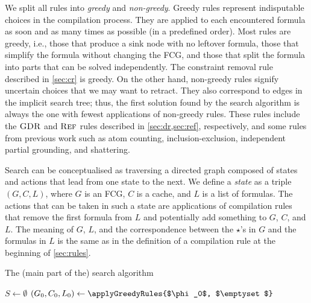 We split all rules into \emph{greedy} and \emph{non-greedy}. Greedy rules
represent indisputable choices in the compilation process. They are applied to
each encountered formula as soon and as many times as possible (in a predefined
order). Most rules are greedy, i.e., those that produce a sink node with no
leftover formula, those that simplify the formula without changing the FCG, and
those that split the formula into parts that can be solved independently. The
constraint removal rule described in \cref{sec:cr} is greedy. On the other hand,
non-greedy rules signify uncertain choices that we may want to retract. They
also correspond to edges in the implicit search tree; thus, the first solution
found by the search algorithm is always the one with fewest applications of
non-greedy rules. These rules include the $\operatorname{\textsc{GDR}}$ and $\operatorname{\textsc{Ref}}$ rules described in
\cref{sec:dr,sec:ref}, respectively, and some rules from previous work
\citep{DBLP:conf/ijcai/BroeckTMDR11} such as atom counting, inclusion-exclusion,
independent partial grounding, and shattering.

Search can be conceptualised as traversing a directed graph composed of states
and actions that lead from one state to the next. We define a \emph{state} as a
triple $(G, C, L)$, where $G$ is an FCG, $C$ is a cache, and $L$ is a list of
formulas. The actions that can be taken in such a state are applications of
compilation rules that remove the first formula from $L$ and potentially add
something to $G$, $C$, and $L$. The meaning of $G$, $L$, and the correspondence
between the $\star$'s in $G$ and the formulas in $L$ is the same as in the
definition of a compilation rule at the beginning of \cref{sec:rules}.


\begin{algorithm}
  \caption{The (main part of the) search algorithm}
  \label{alg:search}
    $S \gets \emptyset$\;
  $(G_0, C_0, L_0) \gets \applyGreedyRules{$\phi_0$, $\emptyset$}$\;\label{line:greedy}
   
\end{algorithm}

